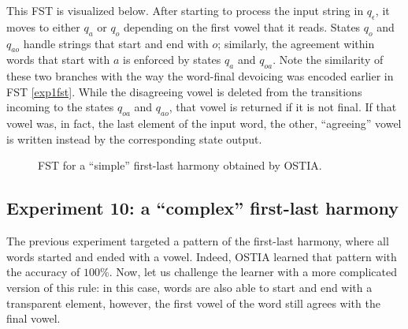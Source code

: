 This FST is visualized below.
After starting to process the input string in $q_\epsilon$, it moves to either $q_a$ or $q_o$ depending on the first vowel that it reads.
States $q_o$ and $q_{ao}$ handle strings that start and end with $o$; similarly, the agreement within words that start with $a$ is enforced by states $q_a$ and $q_{oa}$.
Note the similarity of these two branches with the way the word-final devoicing was encoded earlier in FST \ref{exp1fst}.
While the disagreeing vowel is deleted from the transitions incoming to the states $q_{oa}$ and $q_{ao}$, that vowel is returned if it is not final.
If that vowel was, in fact, the last element of the input word, the other, ``agreeing'' vowel is written instead by the corresponding state output.



\begin{figure}[h!] 
\centering
{}
\caption{FST for a ``simple'' first-last harmony obtained by OSTIA.}
\label{exp9fst}
\end{figure}



\subsection{Experiment 10: a ``complex'' first-last harmony}

The previous experiment targeted a pattern of the first-last harmony, where all words started and ended with a vowel.
Indeed, OSTIA learned that pattern with the accuracy of $100$\%.
Now, let us challenge the learner with a more complicated version of this rule: in this case, words are also able to start and end with a transparent element, however, the first vowel of the word still agrees with the final vowel.


